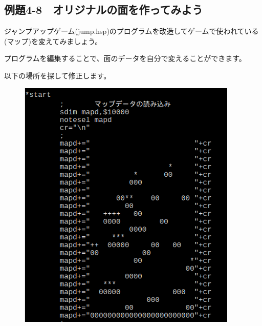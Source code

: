 \newpage
\subsection{例題4-8　オリジナルの面を作ってみよう}


\begin{description}
    \item {}
\end{description}

ジャンプアップゲーム(jump.hsp)のプログラムを改造してゲームで使われている(マップ)を変えてみましょう。

プログラムを編集することで、面のデータを自分で変えることができます。

以下の場所を探して修正します。


\begin{figure}[H]
    \begin{center}
      \includegraphics[keepaspectratio,width=10.478cm,height=12.07cm]{text04-img/text04-img025.png}
    \end{center}
    \label{fig:prog_menu}
\end{figure}



\begin{description}
    \item {}
    \item {}
    \item {}
\end{description}

